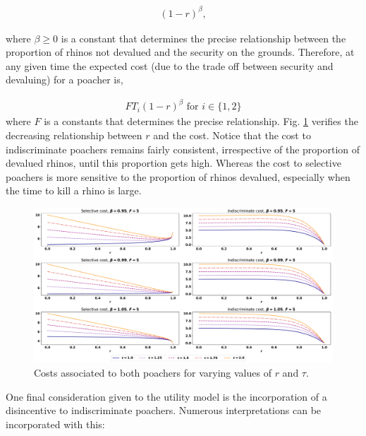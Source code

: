 \documentclass[10pt]{article}
\begin{document}
\begin{eqnarray}
    \label{eqn:risk}
    (1 - r)^{\beta},
\end{eqnarray}

where \(\beta \geq 0\) is a constant that determines the precise relationship
between the proportion of rhinos not devalued and the security on the grounds.
Therefore, at any given time the expected cost (due to the trade off between
security and devaluing) for a poacher is,

\begin{equation}
    \begin{split}
    \label{eqn:cost}
        FT_i(1 - r)^{\beta} \text{ for } i \in \{1, 2\}
    \end{split}
\end{equation}
where \(F\) is a constants that determines the precise relationship. Fig.
\ref{fig:CostCurves} verifies the decreasing relationship between \(r\) and the
cost. Notice that the cost to indiscriminate poachers remains fairly consistent,
irrespective of the proportion of devalued rhinos, until this proportion gets high.
Whereas the cost to selective poachers is more sensitive to the proportion of
rhinos devalued, especially when the time to kill a rhino is large.

\begin{figure}[!htbp]
    \begin{center}
        \includegraphics[width=\linewidth]{images/betas_curve.pdf}
        \caption{Costs associated to both poachers for varying values of \(r\)
        and \(\tau\).}\label{fig:CostCurves}
    \end{center}
\end{figure}

One final consideration given to the utility model is the incorporation of a
disincentive to indiscriminate poachers. Numerous interpretations can be
incorporated with this:
\end{document}
